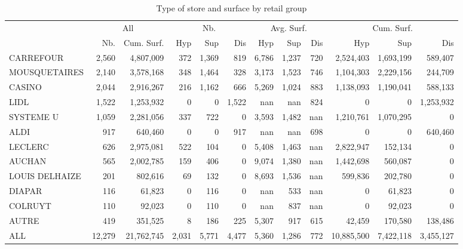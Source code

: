 \documentclass[11pt]{article}
\begin{document}
\begin{table}[H]
\caption{Type of store and surface by retail group}
\footnotesize
\setlength{\tabcolsep}{2pt}

\begin{tabular}{l|rr|rrr|rrr|rrr}
\toprule
{} & \multicolumn{2}{c|}{All} &   \multicolumn{3}{c|}{Nb.}   &   \multicolumn{3}{c|}{Avg. Surf.}   &   \multicolumn{3}{c}{Cum. Surf.} \\
{} &        Nb. &  Cum. Surf. &        Hyp &        Sup &      Dis &        Hyp &        Sup &      Dis &        Hyp &        Sup &      Dis \\
\midrule
CARREFOUR      &      2,560 &   4,807,009 &        372 &      1,369 &        819 &      6,786 &      1,237 &        720 &  2,524,403 &  1,693,199 &    589,407 \\
MOUSQUETAIRES  &      2,140 &   3,578,168 &        348 &      1,464 &        328 &      3,173 &      1,523 &        746 &  1,104,303 &  2,229,156 &    244,709 \\
CASINO         &      2,044 &   2,916,267 &        216 &      1,162 &        666 &      5,269 &      1,024 &        883 &  1,138,093 &  1,190,041 &    588,133 \\
LIDL           &      1,522 &   1,253,932 &          0 &          0 &      1,522 &        nan &        nan &        824 &          0 &          0 &  1,253,932 \\
SYSTEME U      &      1,059 &   2,281,056 &        337 &        722 &          0 &      3,593 &      1,482 &        nan &  1,210,761 &  1,070,295 &          0 \\
ALDI           &        917 &     640,460 &          0 &          0 &        917 &        nan &        nan &        698 &          0 &          0 &    640,460 \\
LECLERC        &        626 &   2,975,081 &        522 &        104 &          0 &      5,408 &      1,463 &        nan &  2,822,947 &    152,134 &          0 \\
AUCHAN         &        565 &   2,002,785 &        159 &        406 &          0 &      9,074 &      1,380 &        nan &  1,442,698 &    560,087 &          0 \\
LOUIS DELHAIZE &        201 &     802,616 &         69 &        132 &          0 &      8,693 &      1,536 &        nan &    599,836 &    202,780 &          0 \\
DIAPAR         &        116 &      61,823 &          0 &        116 &          0 &        nan &        533 &        nan &          0 &     61,823 &          0 \\
COLRUYT        &        110 &      92,023 &          0 &        110 &          0 &        nan &        837 &        nan &          0 &     92,023 &          0 \\
AUTRE          &        419 &     351,525 &          8 &        186 &        225 &      5,307 &        917 &        615 &     42,459 &    170,580 &    138,486 \\
\midrule
ALL            &     12,279 &  21,762,745 &      2,031 &      5,771 &      4,477 &      5,360 &      1,286 &        772 & 10,885,500 &  7,422,118 &  3,455,127 \\
\bottomrule
\end{tabular}


\end{table}
\end{document}
